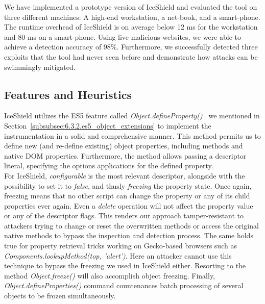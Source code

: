   We have implemented a prototype version of IceShield and evaluated the tool on three different machines: A high-end workstation, a net-book, and a smart-phone. The runtime overhead of IceShield is on average below 12 ms for the workstation and 80 ms on a smart-phone. Using live malicious websites, we were able to achieve a detection accuracy of 98\%. Furthermore, we successfully detected three exploits that the tool had never seen before and demonstrate how attacks can be swimmingly mitigated.\\

    \subsection{Features and Heuristics}
    \label{subsubsec:6.5.1.features_and_heuristics}

    IceShield utilizes the ES5 feature called \textit{Object.defineProperty()}~\cite{_defineproperty_????} we mentioned in Section~\ref{subsubsec:6.3.2.es5_object_extensions} to implement the instrumentation in a solid and comprehensive manner. This method permits us to define new (and re-define existing) object properties, including methods and native DOM properties. Furthermore, the method allows passing a descriptor literal, specifying the options applications for the defined property. \\

    For IceShield, \textit{configurable} is the most relevant descriptor, alongside with the possibility to set it to \textit{false}, and thusly \textit{freezing} the property state. Once again, freezing means that no other script can change the property or any of its child properties ever again. Even a \textit{delete} operation will not affect the property value or any of the descriptor flags. This renders our approach tamper-resistant to attackers trying to change or reset the overwritten methods or access the original native methods to bypass the inspection and detection process. The same holds true for property retrieval tricks working on Gecko-based browsers such as \textit{Components.lookupMethod(top, 'alert')}. Here an attacker cannot use this technique to bypass the freezing we used in IceShield either. Resorting to the method \textit{Object.freeze()} will also accomplish object freezing. Finally, \textit{Object.defineProperties()} command countenances batch processing of several objects to be frozen simultaneously.\\

